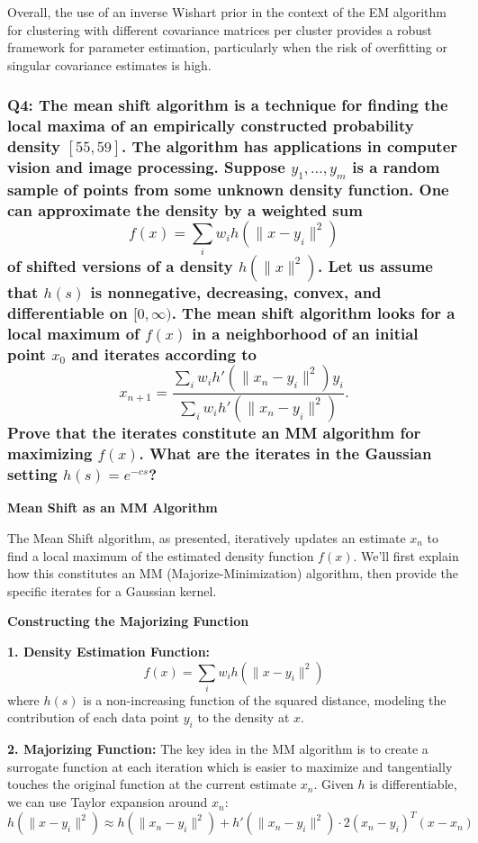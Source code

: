 \documentclass[8pt]{article}
\begin{document}
{Overall, the use of an inverse Wishart prior in the context of the EM algorithm for clustering with different covariance matrices per cluster provides a robust framework for parameter estimation, particularly when the risk of overfitting or singular covariance estimates is high.

\subsubsection*{Q4: The mean shift algorithm is a technique for finding the local maxima of an empirically constructed probability density \([55, 59]\). The algorithm has applications in computer vision and image processing. Suppose \( y_1, \ldots, y_m \) is a random sample of points from some unknown density function. One can approximate the density by a weighted sum
\[
f(x) = \sum_i w_i h(\|x - y_i\|^2)
\]
of shifted versions of a density \( h(\|x\|^2) \). Let us assume that \( h(s) \) is nonnegative, decreasing, convex, and differentiable on \([0, \infty)\). The mean shift algorithm looks for a local maximum of \( f(x) \) in a neighborhood of an initial point \( x_0 \) and iterates according to
\[
x_{n+1} = \frac{\sum_i w_i h'(\|x_n - y_i\|^2) y_i}{\sum_i w_i h'(\|x_n - y_i\|^2)}.
\]
Prove that the iterates constitute an MM algorithm for maximizing \( f(x) \). What are the iterates in the Gaussian setting \( h(s) = e^{-cs} \)?}

\textbf{Mean Shift as an MM Algorithm}

The Mean Shift algorithm, as presented, iteratively updates an estimate \(x_n\) to find a local maximum of the estimated density function \(f(x)\). We'll first explain how this constitutes an MM (Majorize-Minimization) algorithm, then provide the specific iterates for a Gaussian kernel.

\textbf{Constructing the Majorizing Function}

\textbf{1. Density Estimation Function:}
   \[
   f(x) = \sum_i w_i h(\|x - y_i\|^2)
   \]
   where \(h(s)\) is a non-increasing function of the squared distance, modeling the contribution of each data point \(y_i\) to the density at \(x\).

\textbf{2. Majorizing Function:}
   The key idea in the MM algorithm is to create a surrogate function at each iteration which is easier to maximize and tangentially touches the original function at the current estimate \(x_n\). Given \(h\) is differentiable, we can use Taylor expansion around \(x_n\):
   \[
   h(\|x - y_i\|^2) \approx h(\|x_n - y_i\|^2) + h'(\|x_n - y_i\|^2) \cdot 2(x_n - y_i)^T (x - x_n)
   \]

}
\end{document}
